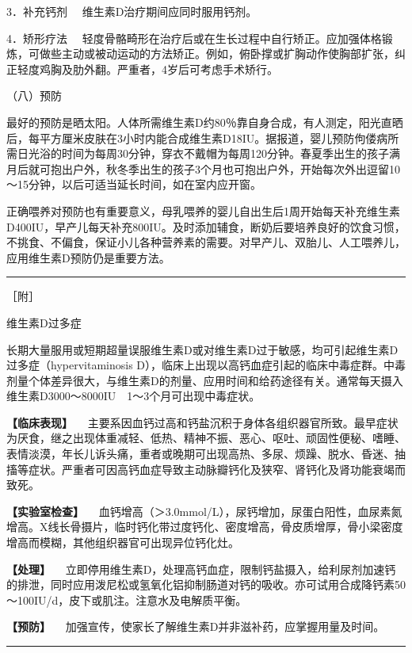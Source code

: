 {3．补充钙剂} 　维生素D治疗期间应同时服用钙剂。

{4．矫形疗法}
　轻度骨骼畸形在治疗后或在生长过程中自行矫正。应加强体格锻炼，可做些主动或被动运动的方法矫正。例如，俯卧撑或扩胸动作使胸部扩张，纠正轻度鸡胸及肋外翻。严重者，4岁后可考虑手术矫行。

（八）预防

最好的预防是晒太阳。人体所需维生素D约80％靠自身合成，有人测定，阳光直晒后，每平方厘米皮肤在3小时内能合成维生素D18IU。据报道，婴儿预防佝偻病所需日光浴的时间为每周30分钟，穿衣不戴帽为每周120分钟。春夏季出生的孩子满月后就可抱出户外，秋冬季出生的孩子3个月也可抱出户外，开始每次外出逗留10～15分钟，以后可适当延长时间，如在室内应开窗。

正确喂养对预防也有重要意义，母乳喂养的婴儿自出生后1周开始每天补充维生素D400IU，早产儿每天补充800IU。及时添加辅食，断奶后要培养良好的饮食习惯，不挑食、不偏食，保证小儿各种营养素的需要。对早产儿、双胎儿、人工喂养儿，应用维生素D预防仍是重要方法。

\begin{center}\rule{0.5\linewidth}{\linethickness}\end{center}

［附］

维生素D过多症

长期大量服用或短期超量误服维生素D或对维生素D过于敏感，均可引起维生素D过多症（hypervitaminosis
D），临床上出现以高钙血症引起的临床中毒症群。中毒剂量个体差异很大，与维生素D的剂量、应用时间和给药途径有关。通常每天摄入维生素D3000～8000IU　1～3个月可出现中毒症状。

\textbf{【临床表现】}
　主要系因血钙过高和钙盐沉积于身体各组织器官所致。最早症状为厌食，继之出现体重减轻、低热、精神不振、恶心、呕吐、顽固性便秘、嗜睡、表情淡漠，年长儿诉头痛，重者或晚期可出现高热、多尿、烦躁、脱水、昏迷、抽搐等症状。严重者可因高钙血症导致主动脉瓣钙化及狭窄、肾钙化及肾功能衰竭而致死。

\textbf{【实验室检查】}
　血钙增高（＞3.0mmol/L），尿钙增加，尿蛋白阳性，血尿素氮增高。X线长骨摄片，临时钙化带过度钙化、密度增高，骨皮质增厚，骨小梁密度增高而模糊，其他组织器官可出现异位钙化灶。

\textbf{【处理】}
　立即停用维生素D，处理高钙血症，限制钙盐摄入，给利尿剂加速钙的排泄，同时应用泼尼松或氢氧化铝抑制肠道对钙的吸收。亦可试用合成降钙素50～100IU/d，皮下或肌注。注意水及电解质平衡。

\textbf{【预防】}
　加强宣传，使家长了解维生素D并非滋补药，应掌握用量及时间。

\begin{center}\rule{0.5\linewidth}{\linethickness}\end{center}


